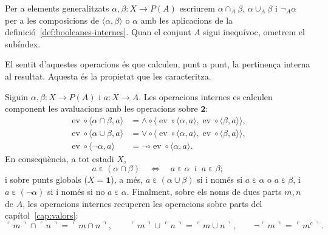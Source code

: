 \begin{notacio}\label{not:booleanes-internes}
Per a elements generalitzats \(\alpha,\beta\colon X\to P(A)\) escriurem
\(\alpha\cap_A\beta\), \(\alpha\cup_A\beta\) i \(\neg_A\alpha\) per a les
composicions de \(\langle\alpha,\beta\rangle\) o \(\alpha\) amb les
aplicacions de la definició~\ref{def:booleanes-internes}. Quan el conjunt
\(A\) sigui inequívoc, ometrem el subíndex.
\end{notacio}

El sentit d'aquestes operacions és que calculen, punt a punt, la
pertinença interna al resultat. Aquesta és la propietat que les
caracteritza.

\begin{proposicio}\label{prop:booleanes-puntuals}
Siguin \(\alpha,\beta\colon X\to P(A)\) i \(a\colon X\to A\). Les
operacions internes es calculen component les avaluacions amb les
operacions sobre \(\mathbf2\):
\begin{align*}
\operatorname{ev}\circ\langle\alpha\cap\beta,a\rangle
&=\wedge\circ\langle\operatorname{ev}\circ\langle\alpha,a\rangle,
\operatorname{ev}\circ\langle\beta,a\rangle\rangle,\\
\operatorname{ev}\circ\langle\alpha\cup\beta,a\rangle
&=\vee\circ\langle\operatorname{ev}\circ\langle\alpha,a\rangle,
\operatorname{ev}\circ\langle\beta,a\rangle\rangle,\\
\operatorname{ev}\circ\langle\neg\alpha,a\rangle
&=\neg\circ\operatorname{ev}\circ\langle\alpha,a\rangle .
\end{align*}
En conseqüència, a tot estadi \(X\),
\[
a\mathrel{\varepsilon}(\alpha\cap\beta)
\quad\Longleftrightarrow\quad
a\mathrel{\varepsilon}\alpha\ \text{ i }\ a\mathrel{\varepsilon}\beta ;
\]
i sobre punts globals (\(X=\mathbf1\)), a més,
\(a\mathrel{\varepsilon}(\alpha\cup\beta)\) si i només si
\(a\mathrel{\varepsilon}\alpha\) o \(a\mathrel{\varepsilon}\beta\), i
\(a\mathrel{\varepsilon}(\neg\alpha)\) si i només si no
\(a\mathrel{\varepsilon}\alpha\). Finalment, sobre els noms de dues parts
\(m,n\) de \(A\), les operacions internes recuperen les operacions sobre
parts del capítol~\ref{cap:valors}:
\[
\ulcorner m\urcorner\cap\ulcorner n\urcorner=\ulcorner m\cap n\urcorner,
\qquad
\ulcorner m\urcorner\cup\ulcorner n\urcorner=\ulcorner m\cup n\urcorner,
\qquad
\neg\ulcorner m\urcorner=\ulcorner m^{c}\urcorner .
\]
\end{proposicio}

